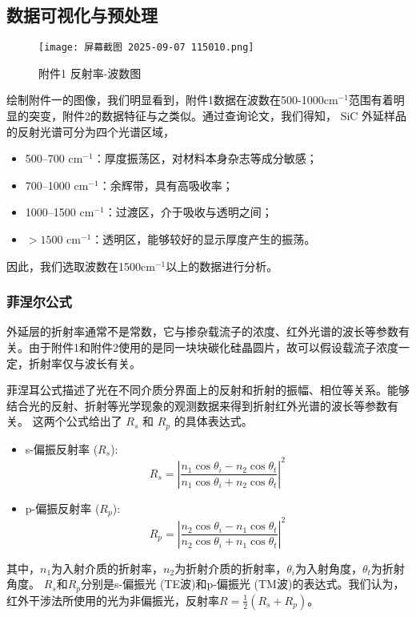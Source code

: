 \documentclass{cumcmthesis}
\begin{document}
	\subsection{数据可视化与预处理}
	\begin{figure}[H]
	\centering
	\texttt{[image: 屏幕截图 2025-09-07 115010.png]}
	\caption{附件1 反射率-波数图}
	\label{fig:refraction_process}
	\end{figure}
	绘制附件一的图像，我们明显看到，附件1数据在波数在500-1000cm$^{-1}$范围有着明显的突变，附件2的数据特征与之类似。通过查询论文，我们得知， SiC 外延样品的反射光谱可分为四个光谱区域，

	\begin{itemize}
  \item 500–700 cm$^{-1}$：厚度振荡区，对材料本身杂志等成分敏感；
  \item 700–1000 cm$^{-1}$：余辉带，具有高吸收率；
  \item 1000–1500 cm$^{-1}$：过渡区，介于吸收与透明之间；
  \item $>1500$ cm$^{-1}$：透明区，能够较好的显示厚度产生的振荡。
\end{itemize}
	因此，我们选取波数在1500cm$^{-1}$以上的数据进行分析。

	\subsubsection{菲涅尔公式}
	外延层的折射率通常不是常数，它与掺杂载流子的浓度、红外光谱的波长等参数有关。由于附件1和附件2使用的是同一块块碳化硅晶圆片，故可以假设载流子浓度一定，折射率仅与波长有关。
	
	菲涅耳公式描述了光在不同介质分界面上的反射和折射的振幅、相位等关系。能够结合光的反射、折射等光学现象的观测数据来得到折射红外光谱的波长等参数有关。
	这两个公式给出了 $R_s$ 和 $R_p$ 的具体表达式。

\begin{itemize}
    \item s-偏振反射率 ($R_s$):
    \[
    R_s = \left| \frac{n_1 \cos \theta_i - n_2 \cos \theta_t}{n_1 \cos \theta_i + n_2 \cos \theta_t} \right|^2
    \]
    
    \item p-偏振反射率 ($R_p$):
    \[
    R_p = \left| \frac{n_2 \cos \theta_i - n_1 \cos \theta_t}{n_2 \cos \theta_i + n_1 \cos \theta_t} \right|^2
    \]
\end{itemize}
其中，$n_1$为入射介质的折射率，$n_2$为折射介质的折射率，$\theta_i$为入射角度，$\theta_t$为折射角度。
$R_s$和$R_p$分别是s-偏振光 (TE波)和p-偏振光 (TM波)的表达式。我们认为，红外干涉法所使用的光为非偏振光，反射率$R = \frac{1}{2}(R_s + R_p)$。
\end{document}
